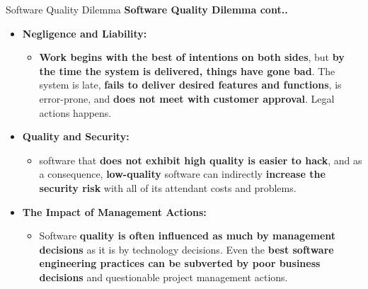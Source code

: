 \documentclass{beamer}
\begin{document}
\begin{frame}{Software Quality Dilemma}
	\textbf{Software Quality Dilemma cont..}
	\begin{itemize}
			\item \textbf{Negligence and Liability:}
			\begin{itemize}
				\item  \textbf{Work begins with the best of intentions on both sides}, but \textbf{by the time the system is delivered, things have gone bad}. The system is late, \textbf{fails to deliver desired features and functions}, is error-prone, and \textbf{does not meet with customer approval}. Legal actions happens.
			\end{itemize}
		\item \textbf{Quality and Security:} 
		\begin{itemize}
			\item software that\textbf{ does not exhibit high quality is easier to hack}, and as a consequence, \textbf{low-quality} software can indirectly \textbf{increase the security risk} with all of its attendant costs and problems.
		\end{itemize}
		\item \textbf{The Impact of Management Actions:}
		\begin{itemize}
			\item  Software \textbf{quality is often influenced as much by management decisions} as it is by technology decisions. Even the \textbf{best software engineering practices can be subverted by poor business decisions} and questionable project management actions.
		\end{itemize}
		
	\end{itemize}
\end{frame}
\end{document}
